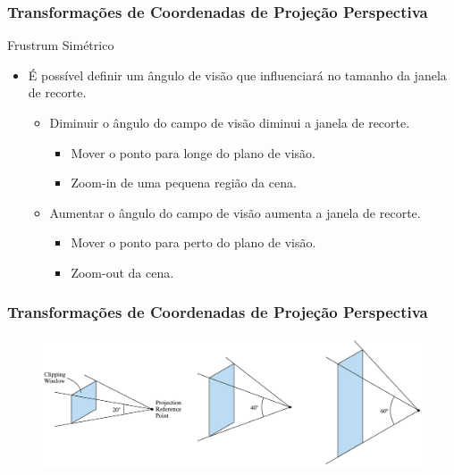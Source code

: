 \documentclass{beamer}
\begin{document}
\begin{frame}
\frametitle{Transformações de Coordenadas de Projeção Perspectiva}
	\begin{block}{Frustrum Simétrico}
		\begin{itemize}
			\item É possível definir um ângulo de visão que influenciará no tamanho da janela de recorte.
			\begin{itemize}
				\item Diminuir o ângulo do campo de visão diminui a janela de recorte.
				\begin{itemize}
					\item Mover o ponto para longe do plano de visão.
					\item Zoom-in de uma pequena região da cena.
				\end{itemize}
				\item Aumentar o ângulo do campo de visão aumenta a janela de recorte.
				\begin{itemize}
					\item Mover o ponto para perto do plano de visão.
					\item Zoom-out da cena.
				\end{itemize}
			\end{itemize}
		\end{itemize}	
	\end{block}
\end{frame}

\begin{frame}
\frametitle{Transformações de Coordenadas de Projeção Perspectiva}
		\begin{figure}[!h]
			\begin{center}
			\includegraphics[width=1\textwidth]{Figures/Zoo}
			\end{center}
	\end{figure}
\end{frame}
\end{document}
